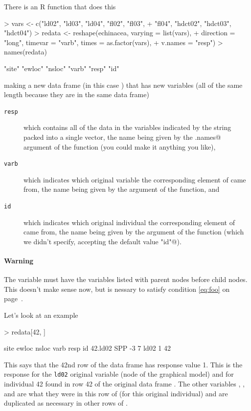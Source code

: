 \documentclass[11pt]{article}
\begin{document}
There is an R function \verb@reshape@ that does this
\begin{Schunk}
\begin{Sinput}
> vars <- c("ld02", "ld03", "ld04", "fl02", "fl03", 
+     "fl04", "hdct02", "hdct03", "hdct04")
> redata <- reshape(echinacea, varying = list(vars), 
+     direction = "long", timevar = "varb", times = as.factor(vars), 
+     v.names = "resp")
> names(redata)
\end{Sinput}
\begin{Soutput}
[1] "site"  "ewloc" "nsloc" "varb"  "resp"  "id"   
\end{Soutput}
\end{Schunk}
making a new data frame (in this case \verb@redata@) that has new
variables (all of the same length because they are in the same data frame)
\begin{description}
\item[\normalfont \texttt{resp}] which contains all of the data in the
variables indicated by the string \verb@vars@ packed into a single vector, the
name \verb@resp@ being given by the \verb@v.names@ argument of the
\verb@reshape@ function (you could make it anything you like),
\item[\normalfont \texttt{varb}] which indicates which original variable the
corresponding
element of \verb@resp@ came from, the name being given by the \verb@timevar@
argument of the \verb@reshape@ function, and
\item[\normalfont \texttt{id}] which indicates which original individual the
corresponding
element of \verb@resp@ came from, the name being given by the \verb@idvar@
argument of the \verb@reshape@ function (which we didn't specify, accepting
the default value \verb@"id"@).
\end{description}

\paragraph{Warning} The variable \verb@vars@ must have the variables
listed with parent nodes before child nodes.  This doesn't make sense
now, but is nessary to satisfy condition \eqref{eq:foo}
on page~\pageref{eq:foo}.

\medskip
Let's look at an example
\begin{Schunk}
\begin{Sinput}
> redata[42, ]
\end{Sinput}
\begin{Soutput}
        site ewloc nsloc varb resp id
42.ld02  SPP    -3     7 ld02    1 42
\end{Soutput}
\end{Schunk}
This says that the 42nd row of the data frame \verb@redata@ has response
value 1.  This is the response for the
\texttt{ld02} original variable
(node of the graphical model)
and for individual 42 found
in row 42
of the original data frame \verb@echinacea@.  The other variables \verb@site@,
\verb@ewloc@, and \verb@nsloc@ are what they were in this row
of \verb@echinacea@
(for this original individual) and are duplicated as necessary in other
rows of \verb@redata@.
\end{document}
